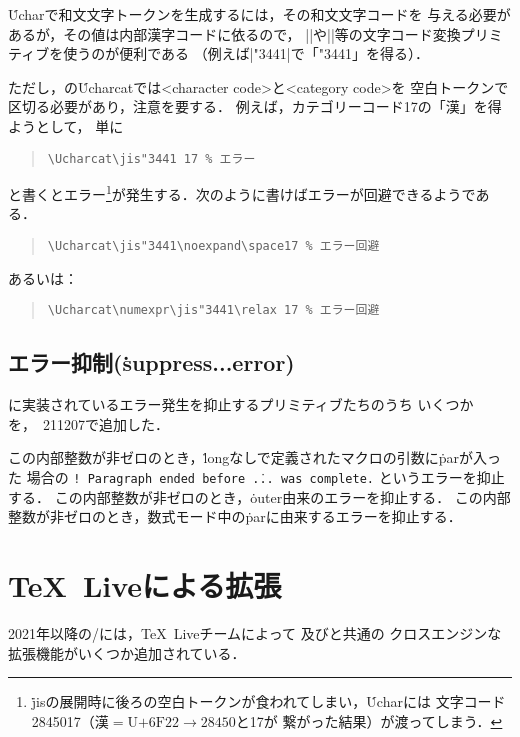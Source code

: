 \documentclass[a4paper,11pt,nomag,dvipdfmx]{jsarticle}
\begin{document}
\begin{dangerous}
  \.{Uchar}で和文文字トークンを生成するには，その和文文字コードを
  与える必要があるが，その値は内部漢字コードに依るので，
  |\jis|や|\euc|等の文字コード変換プリミティブを使うのが便利である
  （例えば|\Uchar\jis"3441|で「\Uchar\jis"3441」を得る）．

  ただし，\eupTeX の\.{Ucharcat}では<character code>と<category code>を
  空白トークンで区切る必要があり，注意を要する．
  例えば，カテゴリーコード17の「漢」を得ようとして，
  単に
  \begin{quote}
	\verb+\Ucharcat\jis"3441 17 % エラー+
  \end{quote}
  と書くとエラー\footnote{%
    \.{jis}の展開時に後ろの空白トークンが食われてしまい，\.{Uchar}には
    文字コード2845017（$\text{漢}=\text{U+6F22}\rightarrow 28450$と17が
    繋がった結果）が渡ってしまう．
  }が発生する．次のように書けばエラーが回避できるようである．
  \begin{quote}
	\verb+\Ucharcat\jis"3441\noexpand\space17 % エラー回避+
  \end{quote}
  あるいは：
  \begin{quote}
	\verb+\Ucharcat\numexpr\jis"3441\relax 17 % エラー回避+
  \end{quote}
\end{dangerous}


\ifdefined\suppresslongerror %
\subsection{エラー抑制(\.{suppress...error})}
に実装されているエラー発生を抑止するプリミティブたちのうち
いくつかを，\epTeX~211207で追加した．
\begin{cslist}
  この内部整数が非ゼロのとき，\.{long}なしで定義されたマクロの引数に\.{par}が入った
  場合の \texttt{! Paragraph ended before \.{...} was complete.} というエラーを抑止する．
  この内部整数が非ゼロのとき，\.{outer}由来のエラーを抑止する．
  この内部整数が非ゼロのとき，数式モード中の\.{par}に由来するエラーを抑止する．
\end{cslist}
\fi


\section{\TeX~Liveによる拡張}
2021年以降の\epTeX/\eupTeX には，\TeX~Liveチームによって
及びと共通の
クロスエンジンな拡張機能がいくつか追加されている．
\end{document}
